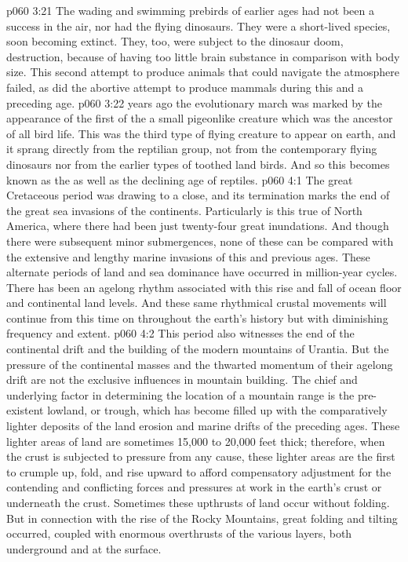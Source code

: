 \vs p060 3:21 The wading and swimming prebirds of earlier ages had not been a success in the air, nor had the flying dinosaurs. They were a short\hyp{}lived species, soon becoming extinct. They, too, were subject to the dinosaur doom, destruction, because of having too little brain substance in comparison with body size. This second attempt to produce animals that could navigate the atmosphere failed, as did the abortive attempt to produce mammals during this and a preceding age.
\pc \vs p060 3:22  years ago the evolutionary march was marked by the  appearance of the first of the  a small pigeonlike creature which was the ancestor of all bird life. This was the third type of flying creature to appear on earth, and it sprang directly from the reptilian group, not from the contemporary flying dinosaurs nor from the earlier types of toothed land birds. And so this becomes known as the  as well as the declining age of reptiles.
\vs p060 4:1 The great Cretaceous period was drawing to a close, and its termination marks the end of the great sea invasions of the continents. Particularly is this true of North America, where there had been just twenty\hyp{}four great inundations. And though there were subsequent minor submergences, none of these can be compared with the extensive and lengthy marine invasions of this and previous ages. These alternate periods of land and sea dominance have occurred in million\hyp{}year cycles. There has been an agelong rhythm associated with this rise and fall of ocean floor and continental land levels. And these same rhythmical crustal movements will continue from this time on throughout the earth’s history but with diminishing frequency and extent.
\vs p060 4:2 This period also witnesses the end of the continental drift and the building of the modern mountains of Urantia. But the pressure of the continental masses and the thwarted momentum of their agelong drift are not the exclusive influences in mountain building. The chief and underlying factor in determining the location of a mountain range is the pre\hyp{}existent lowland, or trough, which has become filled up with the comparatively lighter deposits of the land erosion and marine drifts of the preceding ages. These lighter areas of land are sometimes 15,000 to 20,000 feet thick; therefore, when the crust is subjected to pressure from any cause, these lighter areas are the first to crumple up, fold, and rise upward to afford compensatory adjustment for the contending and conflicting forces and pressures at work in the earth’s crust or underneath the crust. Sometimes these upthrusts of land occur without folding. But in connection with the rise of the Rocky Mountains, great folding and tilting occurred, coupled with enormous overthrusts of the various layers, both underground and at the surface.
